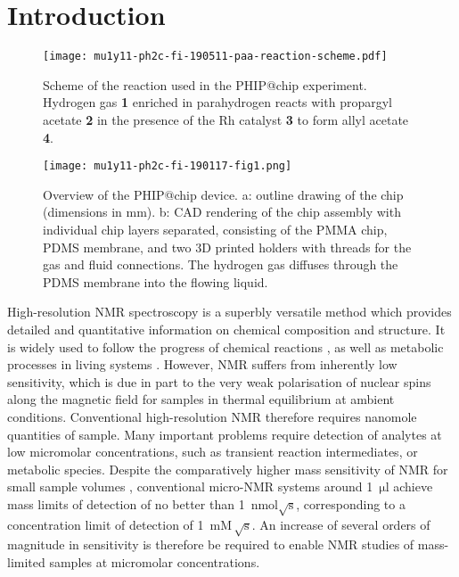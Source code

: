 \section{Introduction}

\begin{figure*}
  \centering
  \texttt{[image: mu1y11-ph2c-fi-190511-paa-reaction-scheme.pdf]}
  \caption{
    Scheme of the reaction used in the PHIP@chip experiment. Hydrogen gas
    \textbf{1}
    enriched in parahydrogen reacts with propargyl acetate \textbf{2} in
    the presence of the Rh catalyst \textbf{3} to form allyl acetate \textbf{4}.
  }
  \label{fig:reaction-scheme}
\end{figure*}

\begin{figure}
	\centering
	\texttt{[image: mu1y11-ph2c-fi-190117-fig1.png]}
	\caption{Overview of the PHIP@chip device.
    a: outline drawing of the chip (dimensions in mm).
		b: CAD rendering of the chip assembly with individual chip layers
		separated, consisting of the PMMA chip, PDMS membrane, and two 3D
		printed holders with threads for the gas and fluid connections.
    The hydrogen gas
		diffuses through the PDMS membrane into the flowing liquid.
		}
	\label{fig:phip@chip1}
\end{figure}

High-resolution NMR
spectroscopy is a superbly versatile method which provides detailed and
quantitative information on chemical composition and structure. It is widely
used to follow the progress of chemical reactions
\cite{Foley-quantitative:2004bk,Foley:2014kpa},
as well as
metabolic processes in living systems
\cite{Wishart:2008ga,Gottschalk:2008ixa,CuperlovicCulf:2010vc,Shintu:2012bl}.
However, NMR suffers from inherently low sensitivity,
which is due in part to the very weak polarisation of nuclear spins along the magnetic
field for samples in thermal equilibrium at ambient conditions.
Conventional high-resolution NMR therefore requires nanomole quantities of
sample. Many important problems require detection of analytes at low
micromolar concentrations, such as transient reaction intermediates, or
metabolic species. Despite the
comparatively higher mass sensitivity of NMR for small sample volumes
\cite{Olson:1995vu,Bart:2009kc}, conventional micro-NMR systems  around
1~$\mathrm{\mu l}$ achieve mass limits of detection of no better than\cite{Finch:2016gv}
1~nmol$\sqrt{\mathrm{s}}$,  corresponding to a concentration
limit of detection of 1~$\mathrm{m M \, \sqrt{s}}$. An increase of several
orders of magnitude in sensitivity is therefore be required to enable NMR
studies of mass-limited samples at micromolar concentrations.

